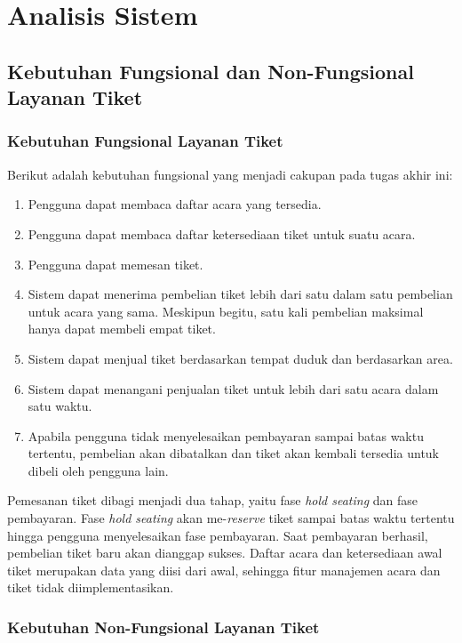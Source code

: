 \chapter{Analisis Sistem}

\section{Kebutuhan Fungsional dan Non-Fungsional Layanan Tiket}

\subsection{Kebutuhan Fungsional Layanan Tiket}

Berikut adalah kebutuhan fungsional yang menjadi cakupan pada tugas akhir ini:

\begin{enumerate}
    \item Pengguna dapat membaca daftar acara yang tersedia.
    \item Pengguna dapat membaca daftar ketersediaan tiket untuk suatu acara.
    \item Pengguna dapat memesan tiket.
    \item Sistem dapat menerima pembelian tiket lebih dari satu dalam satu pembelian untuk acara yang sama. Meskipun begitu, satu kali pembelian maksimal hanya dapat membeli empat tiket.
    \item Sistem dapat menjual tiket berdasarkan tempat duduk dan berdasarkan area.
    \item Sistem dapat menangani penjualan tiket untuk lebih dari satu acara dalam satu waktu.
    \item Apabila pengguna tidak menyelesaikan pembayaran sampai batas waktu tertentu, pembelian akan dibatalkan dan tiket akan kembali tersedia untuk dibeli oleh pengguna lain.
\end{enumerate}

Pemesanan tiket dibagi menjadi dua tahap, yaitu fase \textit{hold seating} dan fase pembayaran. Fase \textit{hold seating} akan me-\textit{reserve} tiket sampai batas waktu tertentu hingga pengguna menyelesaikan fase pembayaran. Saat pembayaran berhasil, pembelian tiket baru akan dianggap sukses. Daftar acara dan ketersediaan awal tiket merupakan data yang diisi dari awal, sehingga fitur manajemen acara dan tiket tidak diimplementasikan.

\subsection{Kebutuhan Non-Fungsional Layanan Tiket}

